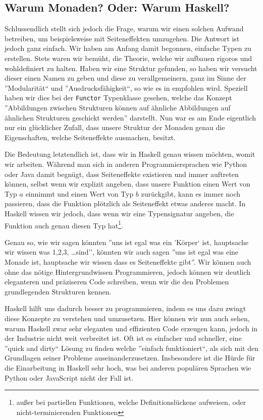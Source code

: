 \documentclass{hhuarticle}
\theoremstyle{definition}
\theoremstyle{theorem}
\begin{document}
  \subsection{Warum Monaden? Oder: Warum Haskell?}

  Schlussendlich stellt sich jedoch die Frage, warum wir einen solchen 
  Aufwand betreiben, um beispielsweise mit Seiteneffekten umzugehen.
  Die Antwort ist jedoch ganz einfach. Wir haben am Anfang damit begonnen,
  einfache Typen zu erstellen. Stets waren wir bemüht, die Theorie, welche
  wir aufbauen rigoros und wohldefiniert zu halten. Haben wir eine
  Struktur gefunden, so haben wir versucht dieser einen Namen zu geben und
  diese zu verallgemeinern, ganz im Sinne der ''Modularität`` und
  ''Ausdrucksfähigkeit``, so wie es in \cite{abelson1996StructureAndInterpretationOfComputerPrograms}
  empfohlen wird.
  Speziell haben wir dies bei der \verb|Functor|
  Typenklasse gesehen, welche das Konzept ''Abbildungen zwischen Strukturen
  können auf ähnliche Abbildungen auf ähnlichen Strukturen geschickt werden''
  darstellt. Nun war es am Ende eigentlich nur ein glücklicher
  Zufall, dass unsere Struktur der Monaden genau die Eigenschaften,
  welche Seiteneffekte ausmachen, besitzt.

  Die Bedeutung letztendlich ist, dass wir in Haskell genau wissen möchten,
  womit wir arbeiten.
  Während man sich in anderen Programmiersprachen
  wie Python oder Java damit begnügt, dass Seiteneffekte existieren
  und immer auftreten können,
  selbst wenn wir explizit angeben,
  dass unsere Funktion einen Wert von Typ $a$ einnimmt und einen Wert
  von Typ $b$ zurückgibt,
  kann es immer noch passieren, dass die Funktion plötzlich als Seiteneffekt
  etwas anderes macht.
  In Haskell wissen wir jedoch, dass wenn
  wir eine Typensignatur angeben, die Funktion auch genau diesen Typ
  hat\footnote{außer bei partiellen Funktionen, welche Definitionslückene aufweisen, oder nicht-terminierenden Funktionen}.

  Genau so, wie wir sagen könnten ''uns ist egal was ein 'Körper` ist,
  hauptsache wir wissen was 1,2,3, \dots sind'', könnten wir auch sagen
  ''uns ist egal was eine Monade ist, hauptsache wir wissen dass es
  Seiteneffekte gibt''. Wir können auch ohne das nötige Hintergrundwissen
  Programmieren, jedoch können wir deutlich eleganteren und präziseren Code
  schreiben, wenn wir die den Problemen grundlegenden Strukturen kennen.

  Haskell hilft uns dadurch besser zu programmieren, indem
  es uns dazu zwingt diese Konzepte zu verstehen und umzusetzen.
  Hier können wir nun auch sehen, warum Haskell zwar sehr eleganten
  und effizienten Code erzeugen kann, jedoch in der Industrie nicht
  weit verbreitet ist. Oft ist es einfacher und schneller, eine
  ''quick and dirty`` Lösung zu finden welche ''einfach funktioniert``,
  als sich mit den Grundlagen seiner Probleme auseinanderzusetzen.
  Insbesondere ist die Hürde für die Einarbeitung in Haskell sehr hoch,
  was bei anderen populären Sprachen wie Python oder JavaScript nicht der Fall ist.
\end{document}
